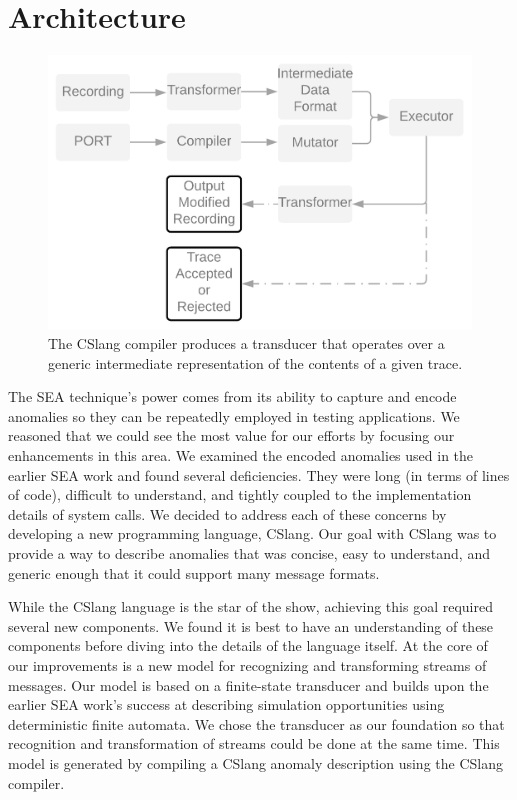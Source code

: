 \section{Architecture}
\label{SEC:architecture}

\begin{figure}
  \includegraphics[scale=.08, frame]{images/architecture}
  \caption{The CSlang compiler produces a transducer that operates over a
  generic intermediate representation of the contents of a given trace.}
  \label{fig:architecture}
\end{figure}


The SEA technique's power comes from its ability to capture and encode
anomalies so they can be repeatedly employed in testing applications.  We
reasoned that we could see the most value for our efforts by focusing our
enhancements in this area.  We examined the encoded anomalies used in the
earlier SEA work and found several deficiencies.
They were
long (in terms of lines of code),
difficult to understand,
and tightly coupled to the implementation details of system calls.
We decided to address each of these concerns by developing a new
programming language, CSlang.  Our goal with CSlang was to provide a way to
describe anomalies that was concise, easy to understand, and generic enough
that it could support many message formats.

While the CSlang language is the star of the show, achieving this goal
required several new components.  We found it is best to have an
understanding of these components before diving into the details of the
language itself.
At the core of our improvements is
a new model for recognizing and transforming streams of messages.  Our
model is based on a finite-state transducer and builds upon the earlier SEA
work's success at describing simulation opportunities using deterministic
finite automata.  We chose the transducer as our foundation so that
recognition and transformation of streams could be done at the same time.
This model is generated by compiling a CSlang anomaly description using the
CSlang compiler.

